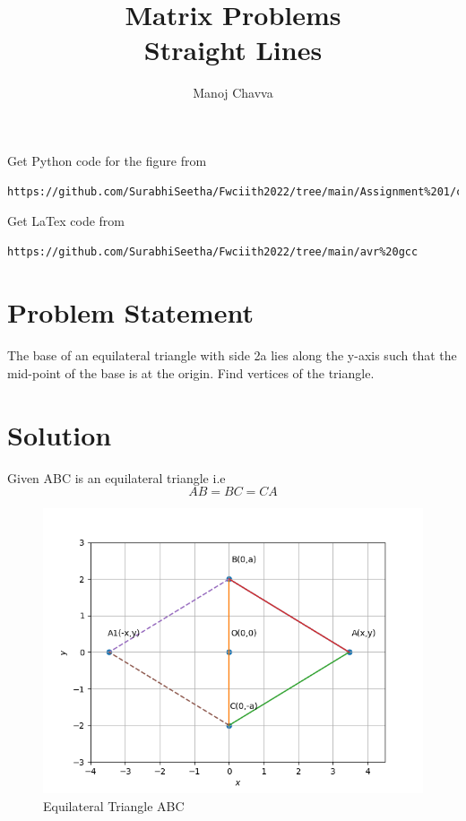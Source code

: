 \documentclass[journal,12pt,twocolumn]{IEEEtran}
\title{Matrix Problems \textbf{\\Straight Lines }}
\author{Manoj Chavva}
\begin{document}
\maketitle

Get Python code for the figure from 
\begin{lstlisting}
https://github.com/SurabhiSeetha/Fwciith2022/tree/main/Assignment%201/codes/src
\end{lstlisting}
Get LaTex code from
\begin{lstlisting}
https://github.com/SurabhiSeetha/Fwciith2022/tree/main/avr%20gcc
\end{lstlisting}

\section{Problem Statement}

\noindent The base of an equilateral triangle with side 2a lies along the y-axis such that the mid-point of the base is at the origin. Find vertices of the triangle.


\section{Solution}
\noindent Given ABC is an equilateral triangle i.e 
\begin{equation}
AB = BC = CA  
\end{equation}

\begin{figure}[h]
\includegraphics[width=1\columnwidth]{triangle.png}
\caption{Equilateral Triangle ABC}
\label{fig:triangle}
\end{figure}
\end{document}
